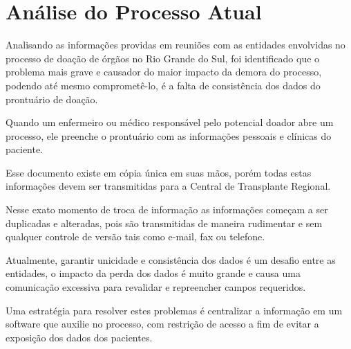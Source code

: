 \documentclass[portuguese,oneside]{tcc}
\begin{document}







\section{Análise do Processo Atual} \label{tab:detalhamento-problema}
Analisando as informações providas em reuniões com as entidades envolvidas no processo de doação de órgãos no Rio Grande do Sul, foi identificado que o problema mais grave e causador do maior impacto da demora do processo, podendo até mesmo comprometê-lo, é a falta de consistência dos dados do prontuário de doação. 

Quando um enfermeiro ou médico responsável pelo potencial doador abre um processo, ele preenche o prontuário com as informações pessoais e clínicas do paciente. 

Esse documento existe em cópia única em suas mãos, porém todas estas informações devem ser transmitidas para a Central de Transplante Regional.

Nesse exato momento de troca de informação as informações começam a ser duplicadas e alteradas, pois são transmitidas de maneira rudimentar e sem qualquer controle de versão tais como e-mail, fax ou telefone.

Atualmente, garantir unicidade e consistência dos dados é um desafio entre as entidades, o impacto da perda dos dados é muito grande e causa uma comunicação excessiva para revalidar e repreencher campos requeridos. 

Uma estratégia para resolver estes problemas é centralizar a informação em um software que auxilie no processo, com restrição de acesso a fim de evitar a exposição dos dados dos pacientes.
\end{document}
